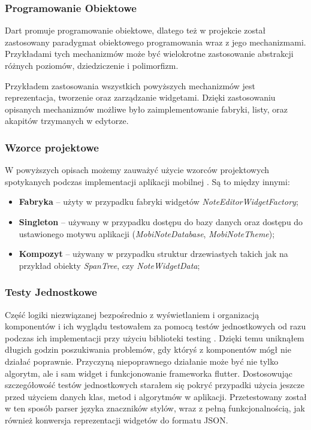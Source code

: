 \subsubsection{Programowanie Obiektowe}

Dart promuje programowanie obiektowe, dlatego też w projekcie został zastosowany paradygmat obiektowego programowania wraz z jego mechanizmami. Przykładami tych mechanizmów może być wielokrotne zastosowanie abstrakcji różnych poziomów, dziedziczenie i polimorfizm.

Przykładem zastosowania wszystkich powyższych mechanizmów jest reprezentacja, tworzenie oraz zarządzanie widgetami. 
Dzięki zastosowaniu opisanych mechanizmów możliwe było zaimplementowanie fabryki, listy, oraz akapitów trzymanych w edytorze.

\subsubsection{Wzorce projektowe}

W powyższych opisach możemy zauważyć użycie wzorców projektowych spotykanych podczas implementacji aplikacji mobilnej \cite{flutterdesignpatterns}. Są to między innymi:

\begin{itemize}
    \item \textbf{Fabryka} -- użyty w przypadku fabryki widgetów \textit{NoteEditorWidgetFactory};
    \item \textbf{Singleton} -- używany w przypadku dostępu do bazy danych oraz dostępu do ustawionego motywu aplikacji (\textit{MobiNoteDatabase}, \textit{MobiNoteTheme});
    \item \textbf{Kompozyt} -- używany w przypadku struktur drzewiastych takich jak na przykład obiekty \textit{SpanTree}, czy \textit{NoteWidgetData};
\end{itemize}

\subsubsection{Testy Jednostkowe}

Część logiki niezwiązanej bezpośrednio z wyświetlaniem i organizacją komponentów i ich wyglądu testowałem za pomocą testów jednostkowych od razu podczas ich implementacji przy użyciu biblioteki testing \cite{testing}. Dzięki temu uniknąłem długich godzin poszukiwania problemów, gdy któryś z komponentów mógł nie działać poprawnie. Przyczyną niepoprawnego działanie może być nie tylko algorytm, ale i sam widget i funkcjonowanie frameworka flutter. Dostosowując szczegółowość testów jednostkowych starałem się pokryć przypadki użycia jeszcze przed użyciem danych klas, metod i algorytmów w aplikacji. Przetestowany został w ten sposób parser języka znaczników stylów, wraz z pełną funkcjonalnością, jak również konwersja reprezentacji widgetów do formatu JSON.

